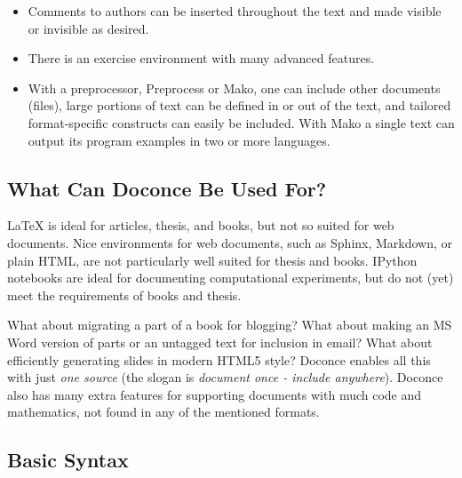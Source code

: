 \documentclass[%
oneside,                 %
final,                   %
10pt]{article}
\begin{document}
\begin{itemize}
  \item Comments to authors can be inserted throughout the text and
    made visible or invisible as desired.

  \item There is an exercise environment with many advanced features.

  \item With a preprocessor, Preprocess or Mako, one can include other
    documents (files), large portions of text can be defined in or out
    of the text, and tailored format-specific constructs can easily be
    included. With Mako a single text can output its program examples
    in two or more languages.
\end{itemize}

\noindent
\subsection{What Can Doconce Be Used For?}

{\LaTeX} is ideal for articles, thesis, and books, but not so suited
for web documents. Nice environments for web documents, such as
Sphinx, Markdown, or plain HTML, are not particularly well
suited for thesis and books. IPython notebooks are ideal for
documenting computational experiments, but do not (yet) meet the
requirements of books and thesis.

What about migrating a part of a book for blogging? What about making
an MS Word version of parts or an untagged text for inclusion in
email?  What about efficiently generating slides in modern HTML5
style?  Doconce enables all this with just \emph{one source} (the slogan is
\emph{document once - include anywhere}).
Doconce also
has many extra features for supporting documents with much code and
mathematics, not found in any of the mentioned formats.

\subsection{Basic Syntax}
\end{document}
